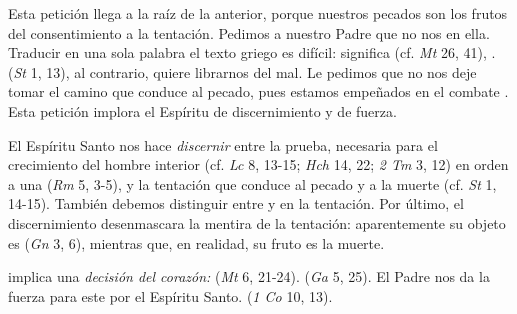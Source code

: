 

\begin{ccebody}
 Esta petición llega a la raíz de la anterior, porque nuestros pecados son los frutos del consentimiento a la tentación. Pedimos a nuestro Padre que no nos  en ella. Traducir en una sola palabra el texto griego es difícil: significa  (cf. \textit{Mt} 26, 41), .  (\textit{St} 1, 13), al contrario, quiere librarnos del mal. Le pedimos que no nos deje tomar el camino que conduce al pecado, pues estamos empeñados en el combate . Esta petición implora el Espíritu de discernimiento y de fuerza.

 El Espíritu Santo nos hace \textit{discernir} entre la prueba, necesaria para el crecimiento del hombre interior (cf. \textit{Lc} 8, 13-15; \textit{Hch} 14, 22; \textit{2 Tm} 3, 12) en orden a una  (\textit{Rm} 5, 3-5), y la tentación que conduce al pecado y a la muerte (cf. \textit{St} 1, 14-15). También debemos distinguir entre  y  en la tentación. Por último, el discernimiento desenmascara la mentira de la tentación: aparentemente su objeto es  (\textit{Gn} 3, 6), mientras que, en realidad, su fruto es la muerte.


  implica una \textit{decisión del corazón:}  (\textit{Mt} 6, 21-24).  (\textit{Ga} 5, 25). El Padre nos da la fuerza para este  por el Espíritu Santo.  (\textit{1 Co} 10, 13).


\end{ccebody}
